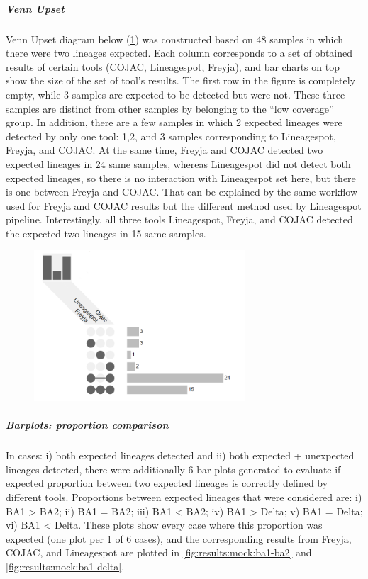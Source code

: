                 \subparagraph{Venn Upset}
                Venn Upset diagram below (\cref{fig:results:mock:venn-twolin}) was constructed based on 48 samples in which there were two lineages expected. Each column corresponds to a set of obtained results of certain tools (COJAC, Lineagespot, Freyja), and bar charts on top show the size of the set of tool’s results. The first row in the figure is completely empty, while 3 samples are expected to be detected but were not. These three samples are distinct from other samples by belonging to the “low coverage” group. In addition, there are a few samples in which 2 expected lineages were detected by only one tool: 1,2, and 3 samples corresponding to Lineagespot, Freyja, and COJAC. At the same time, Freyja and COJAC detected two expected lineages in 24 same samples, whereas Lineagespot did not detect both expected lineages, so there is no interaction with Lineagespot set here, but there is one between Freyja and COJAC. That can be explained by the same workflow used for Freyja and COJAC results but the different method used by Lineagespot pipeline. Interestingly, all three tools Lineagespot, Freyja, and COJAC detected the expected two lineages in 15 same samples.
                \begin{figure}[ht!]
                	\centering
                    \includegraphics[width=0.7\textwidth]{figures/results/mock/venn-twolin.png}
                    \label{fig:results:mock:venn-twolin}
                \end{figure}
                \subparagraph{Barplots: proportion comparison}
                In cases: i) both expected lineages detected and ii) both expected + unexpected lineages detected, there were additionally 6 bar plots generated to evaluate if expected proportion between two expected lineages is correctly defined by different tools. Proportions between expected lineages that were considered are: i) BA1 > BA2; ii) BA1 = BA2; iii) BA1 < BA2; iv) BA1 > Delta;  v) BA1 = Delta; vi) BA1 < Delta. These plots show every case where this proportion was expected (one plot per 1 of 6 cases), and the corresponding results from Freyja, COJAC, and Lineagespot are plotted in \cref{fig:results:mock:ba1-ba2} and \cref{fig:results:mock:ba1-delta}.
